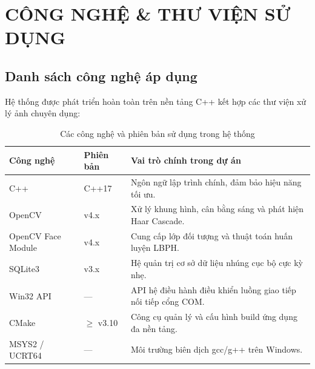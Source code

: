 \documentclass[12pt,a4paper]{article}
\begin{document}
\newpage

\section{CÔNG NGHỆ \& THƯ VIỆN SỬ DỤNG}

\subsection{Danh sách công nghệ áp dụng}
Hệ thống được phát triển hoàn toàn trên nền tảng C++ kết hợp các thư viện xử lý ảnh chuyên dụng:
\begin{table}[H]
    \centering
    \begin{tabular}{|l|l|p{8cm}|}
        \hline
        \textbf{Công nghệ} & \textbf{Phiên bản} & \textbf{Vai trò chính trong dự án} \\ \hline
        C++ & C++17 & Ngôn ngữ lập trình chính, đảm bảo hiệu năng tối ưu. \\ \hline
        OpenCV & v4.x & Xử lý khung hình, cân bằng sáng và phát hiện Haar Cascade. \\ \hline
        OpenCV Face Module & v4.x & Cung cấp lớp đối tượng và thuật toán huấn luyện LBPH. \\ \hline
        SQLite3 & v3.x & Hệ quản trị cơ sở dữ liệu nhúng cục bộ cực kỳ nhẹ. \\ \hline
        Win32 API & — & API hệ điều hành điều khiển luồng giao tiếp nối tiếp cổng COM. \\ \hline
        CMake & $\ge$ v3.10 & Công cụ quản lý và cấu hình build ứng dụng đa nền tảng. \\ \hline
        MSYS2 / UCRT64 & — & Môi trường biên dịch gcc/g++ trên Windows. \\ \hline
    \end{tabular}
    \caption{Các công nghệ và phiên bản sử dụng trong hệ thống}
    \label{tab:tech_stack}
\end{table}
\end{document}
